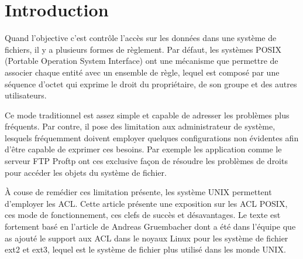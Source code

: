 \section*{Introduction}

Quand l'objective c'est contrôle l'accès sur les données dans une système de fichiers, il y a plusieurs formes de règlement. Par défaut, les systèmes POSIX (Portable Operation System Interface)\cite{ieee1,ieee2} ont une mécanisme que permettre de associer chaque entité avec un ensemble de règle, lequel est composé par une séquence d'octet qui exprime le droit du propriétaire, de son groupe et des autres utilisateurs. 

Ce mode traditionnel est assez simple et capable de adresser les problèmes plus fréquents. Par contre, il pose des limitation aux administrateur de système, lesquels fréquemment doivent employer quelques configurations non évidentes afin d'être capable de exprimer ces besoins. Par exemple les application comme le serveur FTP Proftp\cite{ftp} ont ces exclusive façon de résoudre les problèmes de droits pour accéder les objets du système de fichier.

À couse de remédier ces limitation présente, les système UNIX permettent d'employer les ACL. Cette article présente une exposition sur les ACL POSIX, ces mode de fonctionnement, ces clefs de succès et désavantages. Le texte est fortement basé en l'article de Andreas Gruembacher\cite{aclsuse} dont a été dans l'équipe que as ajouté le support aux ACL dans le noyaux Linux pour les système de fichier ext2 et ext3, lequel est le système de fichier plus utilisé dans les monde UNIX.